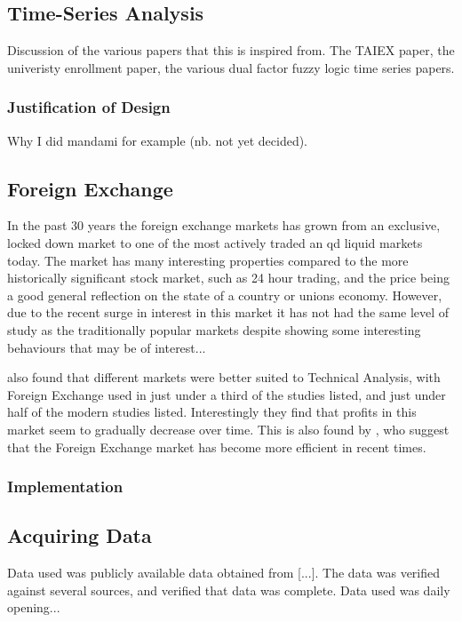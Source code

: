 \documentclass{article}
\theoremstyle{definition}
\begin{document}
\subsection{Time-Series Analysis}

Discussion of the various papers that this is inspired from. The TAIEX paper, the univeristy enrollment paper,  the various dual factor fuzzy logic time series papers.

\subsubsection{Justification of Design}

Why I did mandami for example (nb. not yet decided).

\subsection{Foreign Exchange}

In the past 30 years the foreign exchange markets has grown from an exclusive, locked down market to one of the most actively traded an qd liquid markets today. The market has many interesting properties compared to the more historically significant stock market, such as 24 hour trading, and the price being a good general reflection on the state of a country or unions economy. However, due to the recent surge in interest in this market it has not had the same level of study as the traditionally popular markets despite showing some interesting behaviours that may be of interest...

\cite{taprofitability} also found that different markets were better suited to Technical Analysis, with Foreign Exchange used in just under a third of the studies listed, and just under half of the modern studies listed. Interestingly they find that profits in this market seem to gradually decrease over time. This is also found by \cite{ttrp2006}, who suggest that the Foreign Exchange market has become more efficient in recent times.

\subsubsection{Implementation}

\subsection{Acquiring Data}

Data used was publicly available data obtained from [...]. The data was verified against several sources, and verified that data was complete. Data used was daily opening...
\end{document}

